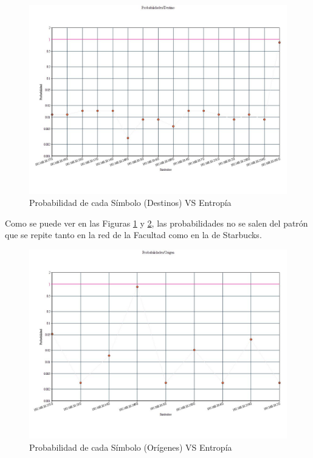 \begin{figure}[H]
  \centering
    \includegraphics[scale=0.45]{imagenes/graficos/Probabilidades/06destino.jpg}
  \caption{Probabilidad de cada Símbolo (Destinos) VS Entropía}
  \label{fig:17}
\end{figure}

Como se puede ver en las Figuras \ref{fig:17} y \ref{fig:18}, las probabilidades no se salen del patrón que se repite tanto en la red de la Facultad como en la de Starbucks.

\begin{figure}[H]
  \centering
    \includegraphics[scale=0.45]{imagenes/graficos/Probabilidades/06origen.jpg}
  \caption{Probabilidad de cada Símbolo (Orígenes) VS Entropía }
  \label{fig:18}
\end{figure}

